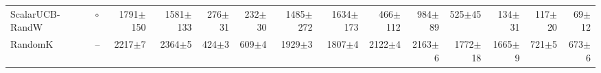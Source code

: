 \begin{tabular}{llrrrrrrrrrrrr}
ScalarUCB-RandW & $\circ$ & 1791{\scriptsize$\pm$150} & 1581{\scriptsize$\pm$133} & 276{\scriptsize$\pm$31} & 232{\scriptsize$\pm$30} & 1485{\scriptsize$\pm$272} & 1634{\scriptsize$\pm$173} & 466{\scriptsize$\pm$112} & 984{\scriptsize$\pm$89} & 525{\scriptsize$\pm$45} & 134{\scriptsize$\pm$31} & 117{\scriptsize$\pm$20} & 69{\scriptsize$\pm$12}\\
RandomK & -- & 2217{\scriptsize$\pm$7} & 2364{\scriptsize$\pm$5} & 424{\scriptsize$\pm$3} & 609{\scriptsize$\pm$4} & 1929{\scriptsize$\pm$3} & 1807{\scriptsize$\pm$4} & 2122{\scriptsize$\pm$4} & 2163{\scriptsize$\pm$6} & 1772{\scriptsize$\pm$18} & 1665{\scriptsize$\pm$9} & 721{\scriptsize$\pm$5} & 673{\scriptsize$\pm$6}\\
\bottomrule
\end{tabular}
